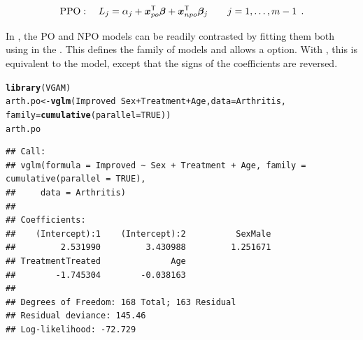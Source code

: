 \documentclass[11pt]{book}\usepackage[]{graphicx}\usepackage[]{color}
\makeatletter
\newcommand{\hlnum}[1]{\textcolor[rgb]{0.686,0.059,0.569}{#1}}%
\newcommand{\hlopt}[1]{\textcolor[rgb]{0,0,0}{#1}}%
\newcommand{\hlstd}[1]{\textcolor[rgb]{0.345,0.345,0.345}{#1}}%
\newcommand{\hlkwb}[1]{\textcolor[rgb]{0.69,0.353,0.396}{#1}}%
\newcommand{\hlkwc}[1]{\textcolor[rgb]{0.333,0.667,0.333}{#1}}%
\newcommand{\hlkwd}[1]{\textcolor[rgb]{0.737,0.353,0.396}{\textbf{#1}}}%
\newenvironment{kframe}{%
 \def\at@end@of@kframe{}%
 \ifinner\ifhmode%
  \def\at@end@of@kframe{\end{minipage}}%
  \begin{minipage}{\columnwidth}%
 \fi\fi%
 \def\FrameCommand##1{\hskip\@totalleftmargin \hskip-\fboxsep
 \colorbox{shadecolor}{##1}\hskip-\fboxsep
     \hskip-\linewidth \hskip-\@totalleftmargin \hskip\columnwidth}%
 \MakeFramed {\advance\hsize-\width
   \@totalleftmargin\z@ \linewidth\hsize
   \@setminipage}}%
 {\par\unskip\endMakeFramed%
 \at@end@of@kframe}
\newenvironment{knitrout}{}{} %
\renewenvironment{knitrout}{\small\renewcommand{\baselinestretch}{.85}}{} %
\makeatother
\begin{document}
\begin{equation}\label{eq:ppo}
   \mathrm{PPO}: \quad
  L_j = \alpha_j + \bm{x}_{po}^\mathsf{T} \bm{\beta} + \bm{x}_{npo}^\mathsf{T} \bm{\beta}_j \quad\quad j=1, \dots , m-1 \:\: .
\end{equation}

In \R, the PO and NPO models can be readily contrasted by fitting them both using
 in the .  This defines the  
family of models and allows a  option.
With , this is equivalent to the  model,
except that the signs of the coefficients are reversed.

\begin{knitrout}
\color{fgcolor}\begin{kframe}
\begin{alltt}
\hlkwd{library}\hlstd{(VGAM)}
\hlstd{arth.po} \hlkwb{<-} \hlkwd{vglm}\hlstd{(Improved} \hlopt{~} \hlstd{Sex} \hlopt{+} \hlstd{Treatment} \hlopt{+} \hlstd{Age,} \hlkwc{data}\hlstd{=Arthritis,}
                \hlkwc{family} \hlstd{=} \hlkwd{cumulative}\hlstd{(}\hlkwc{parallel}\hlstd{=}\hlnum{TRUE}\hlstd{))}
\hlstd{arth.po}
\end{alltt}
\begin{verbatim}
## Call:
## vglm(formula = Improved ~ Sex + Treatment + Age, family = cumulative(parallel = TRUE), 
##     data = Arthritis)
## 
## Coefficients:
##    (Intercept):1    (Intercept):2          SexMale 
##         2.531990         3.430988         1.251671 
## TreatmentTreated              Age 
##        -1.745304        -0.038163 
## 
## Degrees of Freedom: 168 Total; 163 Residual
## Residual deviance: 145.46 
## Log-likelihood: -72.729
\end{verbatim}
\end{kframe}
\end{knitrout}
\end{document}
